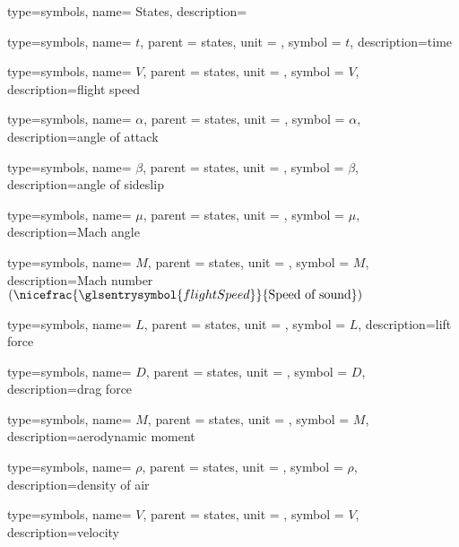{type=symbols,
  name= {States},
  description={}
}

{type=symbols,
  name= \ensuremath{t},
  parent = {states},
  unit = \unexpanded{\si{\second}},
  symbol = \ensuremath{t},
  description={time}
}

{type=symbols,
  name= \ensuremath{V},
  parent = {states},
  unit = \unexpanded{\si{\meter\per\second}},
  symbol = \ensuremath{V},
  description={flight speed}
}

{type=symbols,
  name= \ensuremath{\alpha},
  parent = {states},
  unit = \unexpanded{\si{\radian}},
  symbol = \ensuremath{\alpha},
  description={angle of attack}
}

{type=symbols,
  name= \ensuremath{\beta},
  parent = {states},
  unit = \unexpanded{\si{\radian}},
  symbol = \ensuremath{\beta},
  description={angle of sideslip}
}


{type=symbols,
  name= \ensuremath{\mu},
  parent = {states},
  unit = \unexpanded{\si{\radian}},
  symbol = \ensuremath{\mu},
  description={Mach angle}
}

{type=symbols,
  name= \ensuremath{M},
  parent = {states},
  unit = \unexpanded{},
  symbol = \ensuremath{M},
  description={Mach number $(\nicefrac{\glsentrysymbol{flightSpeed}}{\text{Speed of sound}})$}
}

{type=symbols,
  name= \ensuremath{L},
  parent = {states},
  unit = \unexpanded{\si{\newton}},
  symbol = \ensuremath{L},
  description={lift force}
}

{type=symbols,
  name= \ensuremath{D},
  parent = {states},
  unit = \unexpanded{\si{\newton}},
  symbol = \ensuremath{D},
  description={drag force}
}

{type=symbols,
  name= \ensuremath{M},
  parent = {states},
  unit = \unexpanded{\si{\newton\meter}},
  symbol = \ensuremath{M},
  description={aerodynamic moment}
}

{type=symbols,
  name= \ensuremath{\rho},
  parent = {states},
  unit = \unexpanded{\si{\kilogram\per\meter\cubed}},
  symbol = \ensuremath{\rho},
  description={density of air}
}

{type=symbols,
  name= \ensuremath{V},
  parent = {states},
  unit = \unexpanded{\si{\meter\per\second}},
  symbol = \ensuremath{V},
  description={velocity}
}

